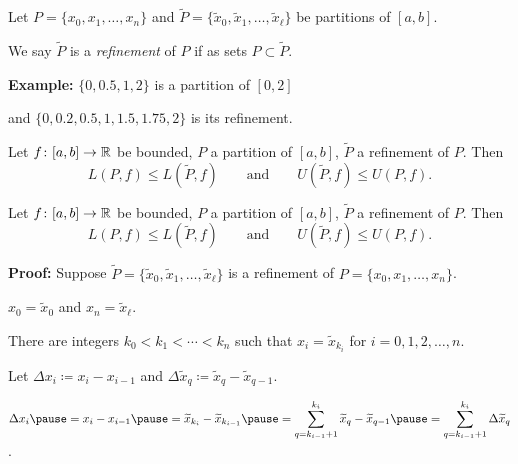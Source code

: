 \documentclass[10pt,aspectratio=149]{beamer}
\begin{document}
\begin{frame}

\begin{definition}
Let $P = \{ x_0, x_1, \ldots, x_n \}$ and
$\widetilde{P} = \{ \widetilde{x}_0, \widetilde{x}_1, \ldots,
\widetilde{x}_{\ell} \}$ be
partitions of $[a,b]$.

\pause
We say $\widetilde{P}$ is a
\emph{refinement} of $P$
if as sets $P \subset \widetilde{P}$.
\end{definition}

\pause
\textbf{Example:}
$\{ 0, 0.5, 1, 2 \}$ is a partition of $[0,2]$

and
$\{ 0, 0.2, 0.5, 1, 1.5, 1.75, 2 \}$ is its refinement.

\pause
\medskip

\begin{proposition}
Let $f \colon [a,b] \to {\mathbb{R}}$ be bounded, $P$
a partition of $[a,b]$, $\widetilde{P}$ a refinement of $P$.
\pause
Then
\begin{equation*}
L(P,f) \leq L(\widetilde{P},f) 
\qquad \text{and} \qquad
U(\widetilde{P},f) \leq U(P,f) .
\end{equation*}
\end{proposition}

\end{frame}

\begin{frame}

\begin{proposition}
Let $f \colon [a,b] \to {\mathbb{R}}$ be bounded, $P$
a partition of $[a,b]$, $\widetilde{P}$ a refinement of $P$.
Then
\begin{equation*}
L(P,f) \leq L(\widetilde{P},f) 
\qquad \text{and} \qquad
U(\widetilde{P},f) \leq U(P,f) .
\end{equation*}
\end{proposition}

\pause
\textbf{Proof:}
Suppose $\widetilde{P} = \{ \widetilde{x}_0, \widetilde{x}_1, \ldots,
\widetilde{x}_{\ell} \}$ is
a refinement of 
$P = \{ x_0, x_1, \ldots, x_n \}$.

\pause
\thus \quad
$x_0 = \widetilde{x}_0$ and 
$x_n = \widetilde{x}_{\ell}$.

\pause
There are integers
$k_0 < k_1 < \cdots < k_n$ such that $x_i = \widetilde{x}_{k_i}$ for
$i=0,1,2,\ldots,n$.

\pause
Let
$\Delta x_i \coloneqq x_i - x_{i-1}$
and
$\Delta \widetilde{x}_q \coloneqq \widetilde{x}_q - \widetilde{x}_{q-1}$.

\pause
\medskip


\pause
\medskip

$\displaystyle
\Delta x_i
\pause
=
x_i - x_{i-1}
\pause
=
\widetilde{x}_{k_i} - \widetilde{x}_{k_{i-1}}
\pause
=
\sum_{q=k_{i-1}+1}^{k_i} 
\widetilde{x}_{q} - \widetilde{x}_{q-1}
\pause
=
\sum_{q=k_{i-1}+1}^{k_i} \Delta \widetilde{x}_q
$.

\end{frame}
\end{document}
